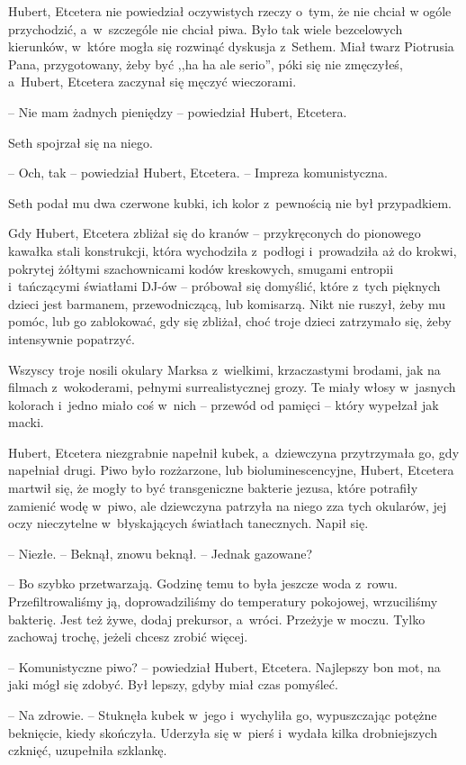 \documentclass[oneside,polish,11pt,sfheadings]{mwbk}
\begin{document}
Hubert, Etcetera nie powiedział oczywistych rzeczy o~tym, że nie chciał
w ogóle przychodzić, a~w~szczególe nie chciał piwa. Było tak wiele
bezcelowych kierunków, w~które mogła się rozwinąć dyskusja z~Sethem.
Miał twarz Piotrusia Pana, przygotowany, żeby być ,,ha ha ale serio'',
póki się nie zmęczyłeś, a~Hubert, Etcetera zaczynał się męczyć
wieczorami.

-- Nie mam żadnych pieniędzy -- powiedział Hubert, Etcetera.

Seth spojrzał się na niego.

-- Och, tak -- powiedział Hubert, Etcetera. -- Impreza komunistyczna.

Seth podał mu dwa czerwone kubki, ich kolor z~pewnością nie był
przypadkiem.

Gdy Hubert, Etcetera zbliżał się do kranów -- przykręconych do pionowego
kawałka stali konstrukcji, która wychodziła z~podłogi i~prowadziła aż do
krokwi, pokrytej żółtymi szachownicami kodów kreskowych, smugami
entropii i~tańczącymi światłami DJ-ów -- próbował się domyślić, które z~tych pięknych dzieci jest barmanem, przewodniczącą, lub komisarzą. Nikt
nie ruszył, żeby mu pomóc, lub go zablokować, gdy się zbliżał, choć
troje dzieci zatrzymało się, żeby intensywnie popatrzyć.

Wszyscy troje nosili okulary Marksa z~wielkimi, krzaczastymi brodami,
jak na filmach z~wokoderami, pełnymi surrealistycznej grozy. Te miały
włosy w~jasnych kolorach i~jedno miało coś w~nich -- przewód od pamięci -- który wypełzał jak macki.

Hubert, Etcetera niezgrabnie napełnił kubek, a~dziewczyna przytrzymała
go, gdy napełniał drugi. Piwo było rozżarzone, lub bioluminescencyjne,
Hubert, Etcetera martwił się, że mogły to być transgeniczne bakterie
jezusa, które potrafiły zamienić wodę w~piwo, ale dziewczyna patrzyła na
niego zza tych okularów, jej oczy nieczytelne w~błyskających światłach
tanecznych. Napił się.

-- Niezłe. -- Beknął, znowu beknął. -- Jednak gazowane?

-- Bo szybko przetwarzają. Godzinę temu to była jeszcze woda z~rowu.
Przefiltrowaliśmy ją, doprowadziliśmy do temperatury pokojowej,
wrzuciliśmy bakterię. Jest też żywe, dodaj prekursor, a~wróci. Przeżyje
w moczu. Tylko zachowaj trochę, jeżeli chcesz zrobić więcej.

-- Komunistyczne piwo? -- powiedział Hubert, Etcetera. Najlepszy bon mot,
na jaki mógł się zdobyć. Był lepszy, gdyby miał czas pomyśleć.

-- Na zdrowie. -- Stuknęła kubek w~jego i~wychyliła go, wypuszczając
potężne beknięcie, kiedy skończyła. Uderzyła się w~pierś i~wydała kilka
drobniejszych czknięć, uzupełniła szklankę.
\end{document}
